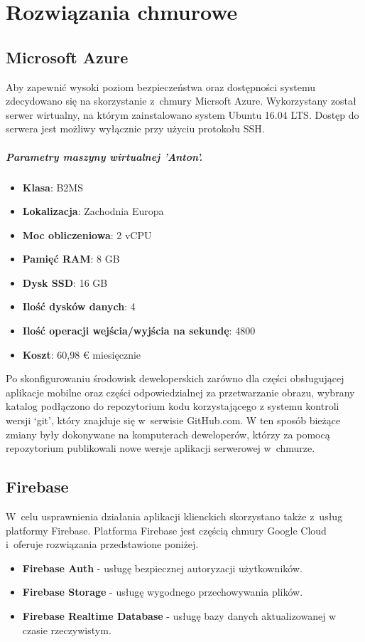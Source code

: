 \chapter{Rozwiązania chmurowe}

\section{Microsoft Azure}

Aby zapewnić wysoki poziom bezpieczeństwa oraz dostępności systemu zdecydowano się na skorzystanie z~chmury Micrsoft Azure.
Wykorzystany został serwer wirtualny, na którym zainstalowano system Ubuntu 16.04 LTS. Dostęp do serwera jest możliwy wyłącznie przy użyciu protokołu SSH.

\paragraph{Parametry maszyny wirtualnej 'Anton'.}
\begin{itemize}
    \item \textbf{Klasa}: B2MS
    \item \textbf{Lokalizacja}: Zachodnia Europa
    \item \textbf{Moc obliczeniowa}: 2 vCPU
    \item \textbf{Pamięć RAM}: 8 GB
    \item \textbf{Dysk SSD}: 16 GB
    \item \textbf{Ilość dysków danych}: 4
    \item \textbf{Ilość operacji wejścia/wyjścia na sekundę}: 4800
    \item \textbf{Koszt}: 60,98 € miesięcznie
\end{itemize}

Po skonfigurowaniu środowisk deweloperskich zarówno dla części obsługującej aplikacje mobilne oraz części odpowiedzialnej za przetwarzanie obrazu, wybrany katalog podłączono do repozytorium kodu korzystającego z systemu kontroli wersji `git', który znajduje się w~serwisie GitHub.com.
W ten sposób bieżące zmiany były dokonywane na komputerach deweloperów, którzy za pomocą repozytorium publikowali nowe wersje aplikacji serwerowej w~chmurze.

\section{Firebase}

W~celu usprawnienia działania aplikacji klienckich skorzystano także z~usług platformy Firebase. Platforma Firebase jest częścią chmury Google Cloud i~oferuje rozwiązania przedstawione poniżej.
\begin{itemize}
    \item \textbf{Firebase Auth} - usługę bezpiecznej autoryzacji użytkowników.
    \item \textbf{Firebase Storage} - usługę wygodnego przechowywania plików.
    \item \textbf{Firebase Realtime Database} - usługę bazy danych aktualizowanej w czasie rzeczywistym.
\end{itemize}

